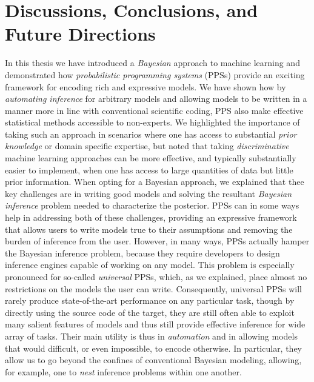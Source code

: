 
\chapter{Discussions, Conclusions, and Future Directions}
\label{chp:discussion}

In this thesis we have introduced a \emph{Bayesian} approach to machine learning and demonstrated
how \emph{probabilistic programming systems} (PPSs) provide an exciting framework for
encoding rich and expressive models.  We have shown how by \emph{automating inference} for
arbitrary models and allowing models to be written in a manner more in line with conventional
scientific coding, PPS also make effective statistical methods accessible to non-experts.
We highlighted the importance of taking such an approach in scenarios where one has
access to substantial \emph{prior knowledge} or domain specific expertise, but noted that taking
\emph{discriminative} machine learning approaches can be more effective, and typically substantially
easier to implement, when one has access to large quantities of data but little prior information.
When opting for a Bayesian approach, we explained that thee key challenges are in writing good models
and solving the resultant \emph{Bayesian inference} problem needed to characterize the posterior.
PPSs can in some ways help in addressing both of these challenges, providing an expressive framework
that allows users to write models true to their assumptions and removing the burden of inference
from the user.  However, in many ways, PPSs actually hamper the Bayesian inference problem, because
they require developers to design inference engines capable of working on any model.
 This problem is especially pronounced
for so-called \emph{universal} PPSs, which, as we explained, place almost no restrictions on the
models the user can write.  Consequently,
universal PPSs will rarely produce state-of-the-art performance on any particular task, though
by directly using the source code of the target, they are still often able to exploit many salient
features of models and thus still provide effective inference for wide array of tasks.
  Their main
utility is thus in \emph{automation} and in allowing models that would difficult, or even impossible,
to encode otherwise.  In particular, they allow us to go beyond
the confines of conventional Bayesian  modeling, allowing, for example, one to \emph{nest} 
inference problems within one another.


